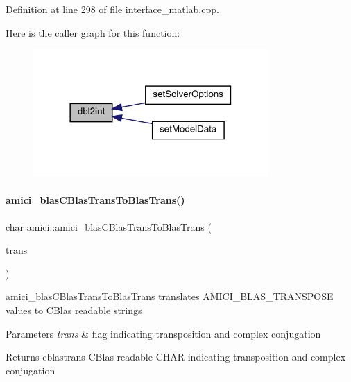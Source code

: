 Definition at line 298 of file interface\+\_\+matlab.\+cpp.

Here is the caller graph for this function\+:
\nopagebreak
\begin{figure}[H]
\begin{center}
\leavevmode
\includegraphics[width=254pt]{namespaceamici_a204c68962100d0020a37392fef2e95e2_icgraph}
\end{center}
\end{figure}
\mbox{\label{namespaceamici_a800e4c3e12f712281a4355e765402260}} 
\paragraph{\texorpdfstring{amici\+\_\+blas\+C\+Blas\+Trans\+To\+Blas\+Trans()}{amici\_blasCBlasTransToBlasTrans()}}
{\footnotesize\ttfamily char amici\+::amici\+\_\+blas\+C\+Blas\+Trans\+To\+Blas\+Trans (\begin{DoxyParamCaption}\item[{\mbox{\hyperlink{namespaceamici_a0f0ec77c6c8f48d9c5cb50d54899afae}{B\+L\+A\+S\+Transpose}}}]{trans }\end{DoxyParamCaption})}

amici\+\_\+blas\+C\+Blas\+Trans\+To\+Blas\+Trans translates A\+M\+I\+C\+I\+\_\+\+B\+L\+A\+S\+\_\+\+T\+R\+A\+N\+S\+P\+O\+SE values to C\+Blas readable strings


\begin{DoxyParams}{Parameters}
{\em trans} & flag indicating transposition and complex conjugation\\
\hline
\end{DoxyParams}
\begin{DoxyReturn}{Returns}
cblastrans C\+Blas readable C\+H\+AR indicating transposition and complex conjugation 
\end{DoxyReturn}


